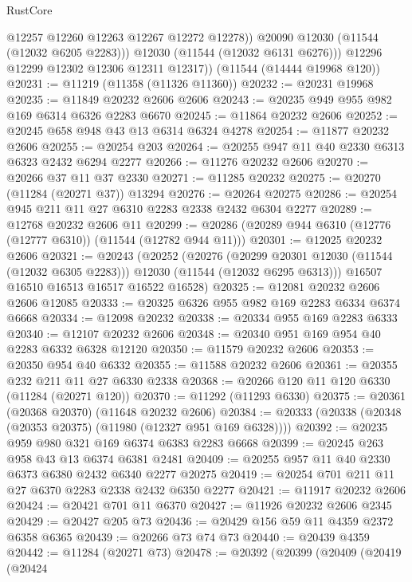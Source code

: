 \begin{lexlean}{RustCore}
\begin{coremodule}
                @12257
                @12260
                @12263
                @12267
                @12272
                @12278))
            @20090
            @12030
            (@11544 (@12032 @6205 @2283)))
          @12030
          (@11544 (@12032 @6131 @6276)))
        @12296
        @12299
        @12302
        @12306
        @12311
        @12317))
    (@11544 (@14444 @19968 @120))
@20231 := @11219 (@11358 (@11326 @11360))
@20232 := @20231 @19968
@20235 := @11849 @20232 @2606 @2606
@20243 := @20235 @949 @955 @982 @169 @6314 @6326 @2283 @6670
@20245 := @11864 @20232 @2606
@20252 := @20245 @658 @948 @43 @13 @6314 @6324 @4278
@20254 := @11877 @20232 @2606
@20255 := @20254 @203
@20264 := @20255 @947 @11 @40 @2330 @6313 @6323 @2432 @6294 @2277
@20266 := @11276 @20232 @2606
@20270 := @20266 @37 @11 @37 @2330
@20271 := @11285 @20232
@20275 := @20270 (@11284 (@20271 @37)) @13294
@20276 := @20264 @20275
@20286 := @20254 @945 @211 @11 @27 @6310 @2283 @2338 @2432 @6304 @2277
@20289 := @12768 @20232 @2606 @11
@20299 := @20286 (@20289 @944 @6310 (@12776 (@12777 @6310)) (@11544 (@12782 @944 @11)))
@20301 := @12025 @20232 @2606
@20321 := @20243
    (@20252
      (@20276
        (@20299 @20301 @12030 (@11544 (@12032 @6305 @2283)))
        @12030
        (@11544 (@12032 @6295 @6313)))
      @16507
      @16510
      @16513
      @16517
      @16522
      @16528)
@20325 := @12081 @20232 @2606 @2606 @12085
@20333 := @20325 @6326 @955 @982 @169 @2283 @6334 @6374 @6668
@20334 := @12098 @20232
@20338 := @20334 @955 @169 @2283 @6333
@20340 := @12107 @20232 @2606
@20348 := @20340 @951 @169 @954 @40 @2283 @6332 @6328 @12120
@20350 := @11579 @20232 @2606
@20353 := @20350 @954 @40 @6332
@20355 := @11588 @20232 @2606
@20361 := @20355 @232 @211 @11 @27 @6330 @2338
@20368 := @20266 @120 @11 @120 @6330 (@11284 (@20271 @120))
@20370 := @11292 (@11293 @6330)
@20375 := @20361 (@20368 @20370) (@11648 @20232 @2606)
@20384 := @20333 (@20338 (@20348 (@20353 @20375) (@11980 (@12327 @951 @169 @6328))))
@20392 := @20235 @959 @980 @321 @169 @6374 @6383 @2283 @6668
@20399 := @20245 @263 @958 @43 @13 @6374 @6381 @2481
@20409 := @20255 @957 @11 @40 @2330 @6373 @6380 @2432 @6340 @2277 @20275
@20419 := @20254 @701 @211 @11 @27 @6370 @2283 @2338 @2432 @6350 @2277
@20421 := @11917 @20232 @2606
@20424 := @20421 @701 @11 @6370
@20427 := @11926 @20232 @2606 @2345
@20429 := @20427 @205 @73
@20436 := @20429 @156 @59 @11 @4359 @2372 @6358 @6365
@20439 := @20266 @73 @74 @73
@20440 := @20439 @4359
@20442 := @11284 (@20271 @73)
@20478 := @20392
    (@20399
      (@20409
        (@20419
          (@20424

\end{coremodule}
\end{lexlean}
